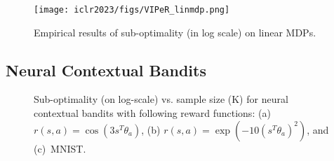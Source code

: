 \documentclass{article} \usepackage{iclr2023/iclr2023_conference,times}
\begin{document}
\begin{figure}
\centering
    \texttt{[image: iclr2023/figs/VIPeR\_linmdp.png]}
    \caption{Empirical results of sub-optimality (in log scale) on linear MDPs.}
    \label{fig: linear mdp}
    \vspace{-10pt}
\end{figure}




\subsection{Neural Contextual Bandits}
\label{subsection: main neural contextual bandits}
\begin{figure}[h!]
    \centering
    \vspace{-10pt}
    \vspace{-15pt}
    \caption{Sub-optimality (on log-scale) vs. sample size (K) for neural contextual bandits with following reward functions: (a) $r(s,a)\!=\!\cos (3 s^T \theta_a)$, (b) $r(s,a)\!=\!\exp (-10 (s^T \theta_a)^2)$, and (c)~MNIST. }
\label{fig: neural contextuable bandits}
\end{figure}
\end{document}

